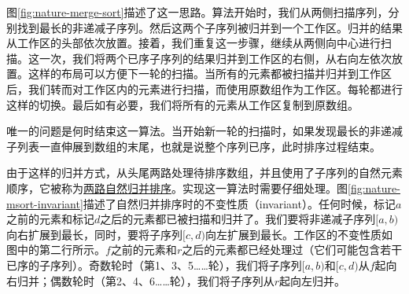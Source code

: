 \documentclass[b5paper]{ctexart}
\begin{document}
图\ref{fig:nature-merge-sort}描述了这一思路。算法开始时，我们从两侧扫描序列，分别找到最长的非递减子序列。然后这两个子序列被归并到一个工作区。归并的结果从工作区的头部依次放置。接着，我们重复这一步骤，继续从两侧向中心进行扫描。这一次，我们将两个已序子序列的结果归并到工作区的右侧，从右向左依次放置。这样的布局可以方便下一轮的扫描。当所有的元素都被扫描并归并到工作区后，我们转而对工作区内的元素进行扫描，而使用原数组作为工作区。每轮都进行这样的切换。最后如有必要，我们将所有的元素从工作区复制到原数组。

唯一的问题是何时结束这一算法。当开始新一轮的扫描时，如果发现最长的非递减子列表一直伸展到数组的末尾，也就是说整个序列已序，此时排序过程结束。

由于这样的归并方式，从头尾两路处理待排序数组，并且使用了子序列的自然元素顺序，它被称为\underline{两路自然归并排序}。实现这一算法时需要仔细处理。图\ref{fig:nature-msort-invariant}描述了自然归并排序时的不变性质（invariant）。任何时候，标记$a$之前的元素和标记$d$之后的元素都已被扫描和归并了。我们要将非递减子序列$[a, b)$向右扩展到最长，同时，要将子序列$[c, d)$向左扩展到最长。工作区的不变性质如图中的第二行所示。$f$之前的元素和$r$之后的元素都已经处理过（它们可能包含若干已序的子序列）。奇数轮时（第1、3、5……轮），我们将子序列$[a, b)$和$[c, d)$从$f$起向右归并；偶数轮时（第2、4、6……轮），我们将子序列从$r$起向左归并。
\end{document}
